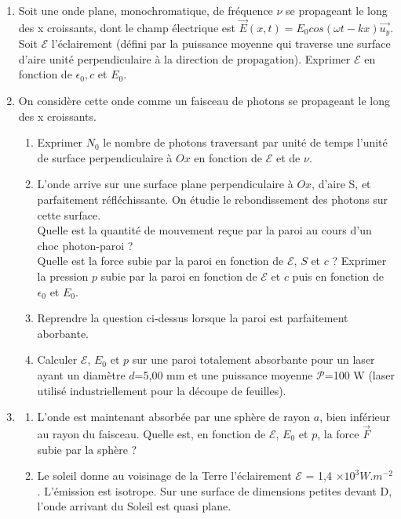 \documentclass{article}
\begin{document}
\begin{enumerate}
    \item Soit une onde plane, monochromatique, de fréquence $\nu$ se propageant le long des x croissants, dont le champ électrique est $\vec{E}(x,t)=E_0cos(\omega t-kx)\vec{u_y}$. Soit  $\mathcal{E}$ l'éclairement (défini par la puissance moyenne qui traverse une surface d'aire unité perpendiculaire à la direction de propagation). Exprimer $\mathcal{E}$ en fonction de $\epsilon_0, c $ et $E_0$. 
    \item On considère cette onde comme un faisceau de photons se propageant le long des x croissants. 
    \begin{enumerate}
        \item Exprimer $N_0$ le nombre de photons traversant par unité de temps l'unité de surface perpendiculaire à $Ox$ en fonction de $\mathcal{E}$ et de $\nu$. 
        \item L'onde arrive sur une surface plane perpendiculaire à $Ox$, d'aire S, et parfaitement réfléchissante. On étudie le rebondissement des photons sur cette surface. 
        \\
        Quelle est la quantité de mouvement reçue par la paroi au cours d'un choc photon-paroi ? \\
        Quelle est la force subie par la paroi en fonction de $\mathcal{E}$, $S$ et $c$ ? 
        Exprimer la pression $p$ subie par la paroi en fonction de $\mathcal{E}$ et $c$ puis en fonction de $\epsilon_0$ et $E_0$. 
        \item Reprendre la question ci-dessus lorsque la paroi est parfaitement aborbante. 
        \item Calculer $\mathcal{E}$, $E_0$ et $p$ sur une paroi totalement absorbante pour un laser ayant un diamètre $d$=5,00 mm et une puissance moyenne $\mathcal{P}$=100 W (laser utilisé industriellement pour la découpe de feuilles). 
    \end{enumerate}
    \item 
    \begin{enumerate} 
    \item L'onde est maintenant absorbée par une sphère de rayon $a$, bien inférieur au rayon du faisceau. Quelle est, en fonction de $\mathcal{E}$, $E_0$ et $p$, la force $\vec{F}$ subie par la sphère ? 
    \item Le soleil donne au voisinage de la Terre l'éclairement $\mathcal{E}$ = 1,4 $\times 10^3 W.m^{-2}$. L'émission est isotrope. Sur une surface de dimensions petites devant D, l'onde arrivant du Soleil est quasi plane. \\

\end{enumerate}
\end{enumerate}
\end{document}
